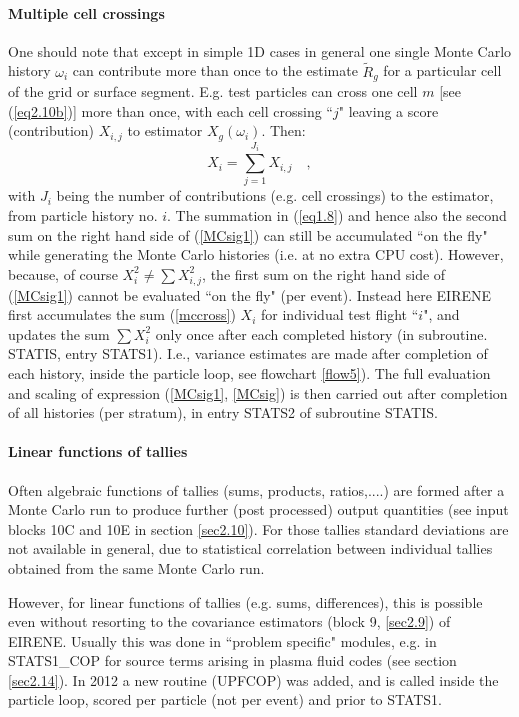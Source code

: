 \paragraph{Multiple cell crossings}

One should note that except in simple 1D cases in general one single Monte Carlo history $\omega_i$ can contribute more than
once to the estimate $\tilde R_g$ for a particular cell of the grid or surface segment. E.g. test particles can cross one cell $m$ [see (\ref{eq2.10b})] more than once,
with each cell crossing ``$j$" leaving a score (contribution) $X_{i,j}$ to estimator $X_g(\omega_i)$. Then:
\begin{equation}\label{mccross}
X_i=\sum_{j=1}^{J_i} X_{i,j} \quad ,
\end{equation}
with $J_i$ being the number of contributions  (e.g. cell crossings) to the estimator, from particle history no. $i$.
The summation in (\ref{eq1.8}) and hence also the second sum on the right hand side of  (\ref{MCsig1}) can still be accumulated
``on the fly" while generating the Monte Carlo histories (i.e. at no extra CPU cost).
However, because, of course  $X_i^2 \neq  \sum X_{i,j}^2$, the first sum on the right hand side of (\ref{MCsig1})
cannot be evaluated ``on the fly" (per event). Instead here EIRENE first accumulates the sum (\ref{mccross}) $X_i$ for individual test flight ``$i$", and updates the
sum $\sum X_i^2$ only once after each completed history (in subroutine. STATIS, entry STATS1). I.e., variance estimates are made after completion of each history, inside the particle loop, see flowchart \ref{flow5}).
The full evaluation and scaling of
expression (\ref{MCsig1}, \ref{MCsig}) is then carried out after completion of all histories (per stratum), in entry STATS2 of subroutine STATIS.
\paragraph{Linear functions of tallies}\label{lin-funct}
Often algebraic functions of tallies (sums, products, ratios,....) are formed after a Monte Carlo run to produce further (post processed) output quantities
(see input blocks 10C and 10E in section \ref{sec2.10}).
For those tallies standard deviations are not available in general, due to statistical correlation between individual tallies obtained from the same Monte Carlo run.

However, for linear functions of tallies (e.g. sums, differences), this is possible even without resorting to the covariance estimators (block 9, \ref{sec2.9}) of EIRENE.
Usually this was done in ``problem specific" modules, e.g. in STATS1\_COP for source terms arising in plasma fluid codes (see section \ref{sec2.14}).
In 2012 a new routine (UPFCOP) was added, and
is called inside the particle loop, scored per particle (not per event) and prior to STATS1.

